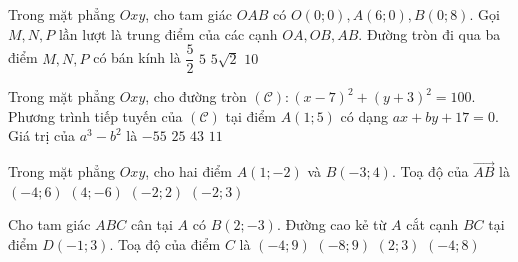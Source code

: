 \begin{ex}%
	Trong mặt phẳng $O x y$, cho tam giác $O A B$ có $O(0 ; 0), A(6 ; 0), B(0 ; 8)$. Gọi $M, N, P$ lần lượt là trung điểm của các cạnh $O A, O B, A B$. Đường tròn đi qua ba điểm $M, N, P$ có bán kính là
	\choice
	{\True $\dfrac{5}{2}$}
	{$ 5 $}
	{$5 \sqrt{2}$}
	{$ 10 $}
\end{ex}


\begin{ex}%
	Trong mặt phẳng $O x y$, cho đường tròn $(\mathscr{C}):(x-7)^2+(y+3)^2=100$. Phương trình tiếp tuyến của $(\mathscr{C})$ tại điểm $A(1 ; 5)$ có dạng $a x+b y+17=0$. Giá trị của $a^3-b^2$ là
	\choice
	{$ -55 $}
	{$ 25 $}
	{$ 43 $}
	{\True$ 11 $}
\end{ex}




\begin{ex}%
	Trong mặt phẳng $O x y$, cho hai điểm $A(1 ;-2)$ và $B(-3 ; 4)$. Toạ độ của $\overrightarrow{A B}$ là
	\choice
	{\True $(-4 ; 6)$}
	{$(4 ;-6)$}
	{$(-2 ; 2)$}
	{$(-2 ; 3)$}
\end{ex}

\begin{ex}%
	Cho tam giác $A B C$ cân tại $A$ có $B(2 ;-3)$. Đường cao kẻ từ $A$ cắt cạnh $B C$ tại điểm $D(-1 ; 3)$. Toạ độ của điểm $C$ là
	\choice
	{\True $(-4 ; 9)$}
	{$(-8 ;9)$}
	{$(2 ; 3)$}
	{$(-4 ; 8)$}
\end{ex}


